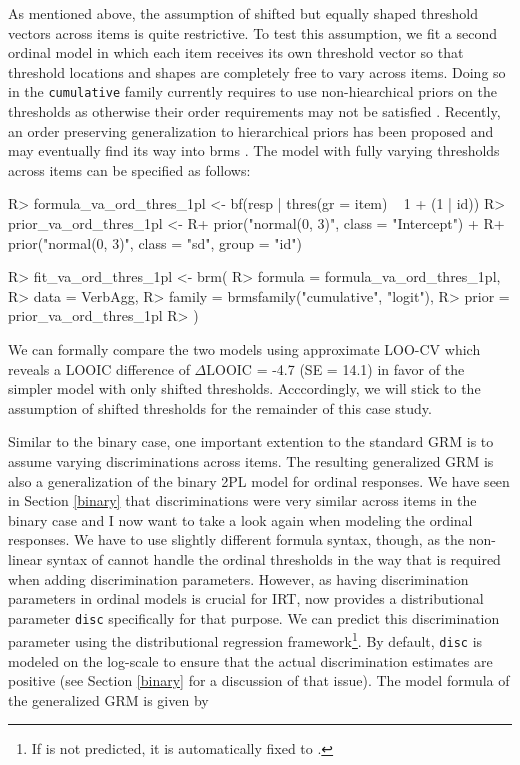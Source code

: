 \documentclass[
]{jss}
\begin{document}
As mentioned above, the assumption of shifted but equally shaped
threshold vectors across items is quite restrictive. To test this
assumption, we fit a second ordinal model in which each item receives
its own threshold vector so that threshold locations and shapes are
completely free to vary across items. Doing so in the
\texttt{cumulative} family currently requires to use non-hiearchical
priors on the thresholds as otherwise their order requirements may not
be satisfied \citep{buerkner2019}. Recently, an order preserving
generalization to hierarchical priors has been proposed and may
eventually find its way into brms \citep{paulewicz2020}. The model with
fully varying thresholds across items can be specified as follows:

\begin{CodeChunk}

\begin{CodeInput}
R> formula_va_ord_thres_1pl <- bf(resp | thres(gr = item) ~ 1 + (1 | id))
R> prior_va_ord_thres_1pl <- 
R+  prior("normal(0, 3)", class = "Intercept") + 
R+  prior("normal(0, 3)", class = "sd", group = "id")
\end{CodeInput}
\end{CodeChunk}

\begin{CodeChunk}

\begin{CodeInput}
R> fit_va_ord_thres_1pl <- brm(
R>  formula = formula_va_ord_thres_1pl,
R>  data = VerbAgg,
R>  family = brmsfamily("cumulative", "logit"),
R>  prior = prior_va_ord_thres_1pl
R> )
\end{CodeInput}
\end{CodeChunk}

We can formally compare the two models using approximate LOO-CV which
reveals a LOOIC difference of \(\Delta \text{LOOIC}\) = -4.7 (SE = 14.1)
in favor of the simpler model with only shifted thresholds.
Acccordingly, we will stick to the assumption of shifted thresholds for
the remainder of this case study.

Similar to the binary case, one important extention to the standard GRM
is to assume varying discriminations across items. The resulting
generalized GRM is also a generalization of the binary 2PL model for
ordinal responses. We have seen in Section \ref{binary} that
discriminations were very similar across items in the binary case and I
now want to take a look again when modeling the ordinal responses. We
have to use slightly different formula syntax, though, as the non-linear
syntax of  cannot handle the ordinal thresholds in the way
that is required when adding discrimination parameters. However, as
having discrimination parameters in ordinal models is crucial for IRT,
 now provides a distributional parameter \texttt{disc}
specifically for that purpose. We can predict this discrimination
parameter using the distributional regression
framework\footnote{If  is not predicted, it is automatically fixed to
.}. By default, \texttt{disc} is modeled on the log-scale to
ensure that the actual discrimination estimates are positive (see
Section \ref{binary} for a discussion of that issue). The model formula
of the generalized GRM is given by
\end{document}
